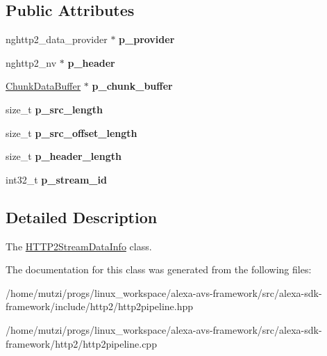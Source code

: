 \subsection*{Public Attributes}
\begin{DoxyCompactItemize}
\item 
\mbox{\label{classhttp2_1_1HTTP2StreamDataInfo_a58705a9371df8fd3812e2e1d49adb872}} 
nghttp2\+\_\+data\+\_\+provider $\ast$ {\bfseries p\+\_\+provider}
\item 
\mbox{\label{classhttp2_1_1HTTP2StreamDataInfo_ada54e29e849c02456e5a60b74c369034}} 
nghttp2\+\_\+nv $\ast$ {\bfseries p\+\_\+header}
\item 
\mbox{\label{classhttp2_1_1HTTP2StreamDataInfo_a44ce66ff0bc26011bcec34026260abf0}} 
\hyperlink{classhttp2_1_1ChunkDataBuffer}{Chunk\+Data\+Buffer} $\ast$ {\bfseries p\+\_\+chunk\+\_\+buffer}
\item 
\mbox{\label{classhttp2_1_1HTTP2StreamDataInfo_a43231c400641505ef9d4a8da4e2e5908}} 
size\+\_\+t {\bfseries p\+\_\+src\+\_\+length}
\item 
\mbox{\label{classhttp2_1_1HTTP2StreamDataInfo_aa071b3ebfef0089534d9db7f03d53c49}} 
size\+\_\+t {\bfseries p\+\_\+src\+\_\+offset\+\_\+length}
\item 
\mbox{\label{classhttp2_1_1HTTP2StreamDataInfo_a734959397073fb8d94f3c6144c303748}} 
size\+\_\+t {\bfseries p\+\_\+header\+\_\+length}
\item 
\mbox{\label{classhttp2_1_1HTTP2StreamDataInfo_a6871628355d4ba7a0e80d7f161907f28}} 
int32\+\_\+t {\bfseries p\+\_\+stream\+\_\+id}
\end{DoxyCompactItemize}


\subsection{Detailed Description}
The \hyperlink{classhttp2_1_1HTTP2StreamDataInfo}{H\+T\+T\+P2\+Stream\+Data\+Info} class. 

The documentation for this class was generated from the following files\+:\begin{DoxyCompactItemize}
\item 
/home/mutzi/progs/linux\+\_\+workspace/alexa-\/avs-\/framework/src/alexa-\/sdk-\/framework/include/http2/http2pipeline.\+hpp\item 
/home/mutzi/progs/linux\+\_\+workspace/alexa-\/avs-\/framework/src/alexa-\/sdk-\/framework/http2/http2pipeline.\+cpp\end{DoxyCompactItemize}
